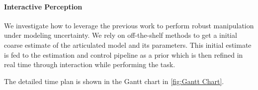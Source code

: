 \paragraph{Interactive Perception} We investigate how to leverage the previous work to perform robust manipulation under modeling uncertainty. We rely on off-the-shelf methods to get a initial coarse estimate of the articulated model and its parameters. This initial estimate is fed to the estimation and control pipeline as a prior which is then refined in real time through interaction while performing the task. 

The detailed time plan is shown in the Gantt chart in \cref{fig:Gantt Chart}.

